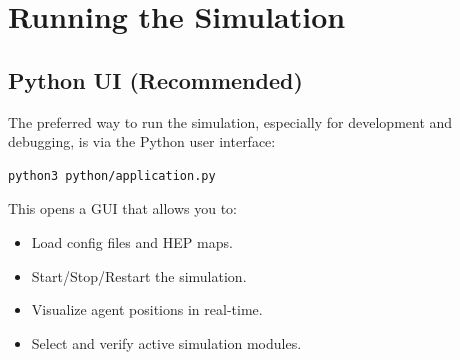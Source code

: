 \section{Running the Simulation}
\subsection{Python UI (Recommended)}
The preferred way to run the simulation, especially for development and debugging, is via the Python user interface:
\begin{lstlisting}[language=bash]
python3 python/application.py
\end{lstlisting}
This opens a GUI that allows you to:
\begin{itemize}
    \item Load config files and HEP maps.
    \item Start/Stop/Restart the simulation.
    \item Visualize agent positions in real-time.
    \item Select and verify active simulation modules.
\end{itemize}
